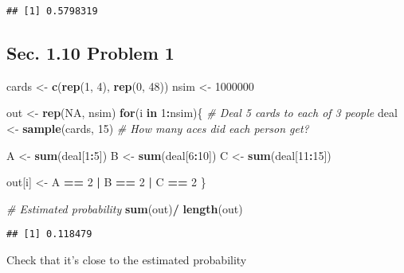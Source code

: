 \documentclass[]{article}
\newenvironment{Shaded}{\begin{snugshade}}{\end{snugshade}}
\newcommand{\KeywordTok}[1]{\textcolor[rgb]{0.13,0.29,0.53}{\textbf{#1}}}
\newcommand{\DecValTok}[1]{\textcolor[rgb]{0.00,0.00,0.81}{#1}}
\newcommand{\StringTok}[1]{\textcolor[rgb]{0.31,0.60,0.02}{#1}}
\newcommand{\CommentTok}[1]{\textcolor[rgb]{0.56,0.35,0.01}{\textit{#1}}}
\newcommand{\OtherTok}[1]{\textcolor[rgb]{0.56,0.35,0.01}{#1}}
\newcommand{\ControlFlowTok}[1]{\textcolor[rgb]{0.13,0.29,0.53}{\textbf{#1}}}
\newcommand{\OperatorTok}[1]{\textcolor[rgb]{0.81,0.36,0.00}{\textbf{#1}}}
\newcommand{\NormalTok}[1]{#1}
\begin{document}
\begin{verbatim}
## [1] 0.5798319
\end{verbatim}

\subsection{Sec. 1.10 Problem 1}\label{sec.-1.10-problem-1}

\begin{Shaded}
\begin{Highlighting}[]
\NormalTok{cards <-}\StringTok{ }\KeywordTok{c}\NormalTok{(}\KeywordTok{rep}\NormalTok{(}\DecValTok{1}\NormalTok{, }\DecValTok{4}\NormalTok{), }\KeywordTok{rep}\NormalTok{(}\DecValTok{0}\NormalTok{, }\DecValTok{48}\NormalTok{))}
\NormalTok{nsim <-}\StringTok{ }\DecValTok{1000000}

\NormalTok{out <-}\StringTok{ }\KeywordTok{rep}\NormalTok{(}\OtherTok{NA}\NormalTok{, nsim)}
\ControlFlowTok{for}\NormalTok{(i }\ControlFlowTok{in} \DecValTok{1}\OperatorTok{:}\NormalTok{nsim)\{}
  \CommentTok{# Deal 5 cards to each of 3 people}
\NormalTok{  deal <-}\StringTok{ }\KeywordTok{sample}\NormalTok{(cards, }\DecValTok{15}\NormalTok{)}
  \CommentTok{# How many aces did each person get? }
  
\NormalTok{  A <-}\StringTok{ }\KeywordTok{sum}\NormalTok{(deal[}\DecValTok{1}\OperatorTok{:}\DecValTok{5}\NormalTok{])}
\NormalTok{  B <-}\StringTok{ }\KeywordTok{sum}\NormalTok{(deal[}\DecValTok{6}\OperatorTok{:}\DecValTok{10}\NormalTok{])}
\NormalTok{  C <-}\StringTok{ }\KeywordTok{sum}\NormalTok{(deal[}\DecValTok{11}\OperatorTok{:}\DecValTok{15}\NormalTok{])}
  
\NormalTok{  out[i] <-}\StringTok{ }\NormalTok{A }\OperatorTok{==}\StringTok{ }\DecValTok{2} \OperatorTok{|}\StringTok{ }\NormalTok{B }\OperatorTok{==}\StringTok{ }\DecValTok{2} \OperatorTok{|}\StringTok{ }\NormalTok{C }\OperatorTok{==}\StringTok{ }\DecValTok{2}
\NormalTok{\}}

\CommentTok{# Estimated probability }
\KeywordTok{sum}\NormalTok{(out)}\OperatorTok{/}\StringTok{ }\KeywordTok{length}\NormalTok{(out)}
\end{Highlighting}
\end{Shaded}

\begin{verbatim}
## [1] 0.118479
\end{verbatim}

Check that it's close to the estimated probability
\end{document}

